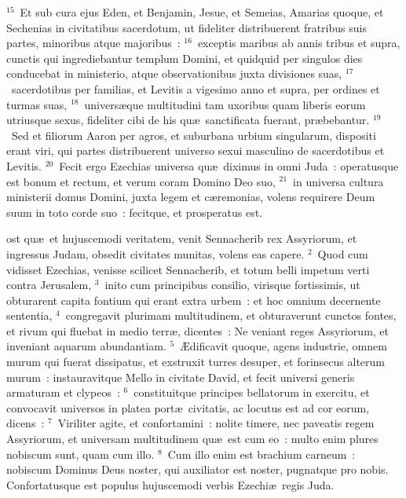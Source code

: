 ${}^{15}$~Et sub cura ejus Eden, et Benjamin, Jesue, et Semeias, Amarias quoque, et Sechenias in civitatibus sacerdotum, ut fideliter distribuerent fratribus suis partes, minoribus atque majoribus~:
${}^{16}$~exceptis maribus ab annis tribus et supra, cunctis qui ingrediebantur templum Domini, et quidquid per singulos dies conducebat in ministerio, atque observationibus juxta divisiones suas,
${}^{17}$~sacerdotibus per familias, et Levitis a vigesimo anno et supra, per ordines et turmas suas,
${}^{18}$~univers\ae que multitudini tam uxoribus quam liberis eorum utriusque sexus, fideliter cibi de his qu\ae\ sanctificata fuerant, pr\ae bebantur.
${}^{19}$~Sed et filiorum Aaron per agros, et suburbana urbium singularum, dispositi erant viri, qui partes distribuerent universo sexui masculino de sacerdotibus et Levitis.
${}^{20}$~Fecit ergo Ezechias universa qu\ae\ diximus in omni Juda~: operatusque est bonum et rectum, et verum coram Domino Deo suo,
${}^{21}$~in universa cultura ministerii domus Domini, juxta legem et c\ae remonias, volens requirere Deum suum in toto corde suo~: fecitque, et prosperatus est.

\bchapter
{}ost qu\ae\ et hujuscemodi veritatem, venit Sennacherib rex Assyriorum, et ingressus Judam, obsedit civitates munitas, volens eas capere.
${}^{2}$~Quod cum vidisset Ezechias, venisse scilicet Sennacherib, et totum belli impetum verti contra Jerusalem,
${}^{3}$~inito cum principibus consilio, virisque fortissimis, ut obturarent capita fontium qui erant extra urbem~: et hoc omnium decernente sententia,
${}^{4}$~congregavit plurimam multitudinem, et obturaverunt cunctos fontes, et rivum qui fluebat in medio terr\ae , dicentes~: Ne veniant reges Assyriorum, et inveniant aquarum abundantiam.
${}^{5}$~\AE dificavit quoque, agens industrie, omnem murum qui fuerat dissipatus, et exstruxit turres desuper, et forinsecus alterum murum~: instauravitque Mello in civitate David, et fecit universi generis armaturam et clypeos~:
${}^{6}$~constituitque principes bellatorum in exercitu, et convocavit universos in platea port\ae\ civitatis, ac locutus est ad cor eorum, dicens~:
${}^{7}$~Viriliter agite, et confortamini~: nolite timere, nec paveatis regem Assyriorum, et universam multitudinem qu\ae\ est cum eo~: multo enim plures nobiscum sunt, quam cum illo.
${}^{8}$~Cum illo enim est brachium carneum~: nobiscum Dominus Deus noster, qui auxiliator est noster, pugnatque pro nobis. Confortatusque est populus hujuscemodi verbis Ezechi\ae\ regis Juda.


